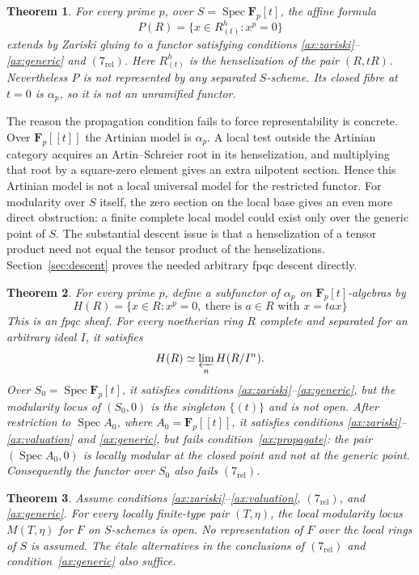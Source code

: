 \documentclass[11pt]{article}
\newtheorem{theorem}{Theorem}[section]
\theoremstyle{definition}\newtheorem{definition}[theorem]{Definition}
\theoremstyle{remark}\newtheorem{remark}[theorem]{Remark}
\newcommand{\F}{\mathbf F}
\newcommand{\Spec}{\operatorname{Spec}}
\begin{document}
\begin{theorem}\label{thm:counterexample}
For every prime $p$, over $S=\Spec\F_p[t]$, the affine formula
\[
 P(R)=\{x\in R^h_{(t)}:x^p=0\}
\]
extends by Zariski gluing to a functor satisfying conditions \ref{ax:zariski}--\ref{ax:generic} and $(7_{\mathrm{rel}})$. Here $R^h_{(t)}$ is the henselization of the pair $(R,tR)$. Nevertheless $P$ is not represented by any separated $S$-scheme. Its closed fibre at $t=0$ is $\alpha_p$, so it is not an unramified functor.
\end{theorem}

The reason the propagation condition fails to force representability is concrete. Over $\F_p[[t]]$ the Artinian model is $\alpha_p$. A local test outside the Artinian category acquires an Artin--Schreier root in its henselization, and multiplying that root by a square-zero element gives an extra nilpotent section. Hence this Artinian model is not a local universal model for the restricted functor. For modularity over $S$ itself, the zero section on the local base gives an even more direct obstruction: a finite complete local model could exist only over the generic point of $S$. The substantial descent issue is that a henselization of a tensor product need not equal the tensor product of the henselizations. Section~\ref{sec:descent} proves the needed arbitrary fpqc descent directly.

\begin{theorem}\label{thm:adic}
For every prime $p$, define a subfunctor of $\alpha_p$ on $\F_p[t]$-algebras by
\[
 H(R)=\{x\in R:x^p=0,\ \text{there is }a\in R\text{ with }x=tax\}
\]
This is an fpqc sheaf. For every noetherian ring $R$ complete and separated for an arbitrary ideal $I$, it satisfies
\[
 H(R)\simeq\varprojlim_n H(R/I^n).
\]
Over $S_0=\Spec\F_p[t]$, it satisfies conditions \ref{ax:zariski}--\ref{ax:generic}, but the modularity locus of $(S_0,0)$ is the singleton $\{(t)\}$ and is not open. After restriction to $\Spec A_0$, where $A_0=\F_p[[t]]$, it satisfies conditions \ref{ax:zariski}--\ref{ax:valuation} and \ref{ax:generic}, but fails condition~\ref{ax:propagate}: the pair $(\Spec A_0,0)$ is locally modular at the closed point and not at the generic point. Consequently the functor over $S_0$ also fails $(7_{\mathrm{rel}})$.
\end{theorem}

\begin{theorem}\label{thm:openness}
Assume conditions \ref{ax:zariski}--\ref{ax:valuation}, $(7_{\mathrm{rel}})$, and \ref{ax:generic}. For every locally finite-type pair $(T,\eta)$, the local modularity locus $M(T,\eta)$ for $F$ on $S$-schemes is open. No representation of $F$ over the local rings of $S$ is assumed. The \'etale alternatives in the conclusions of $(7_{\mathrm{rel}})$ and condition~\ref{ax:generic} also suffice.
\end{theorem}
\end{document}
